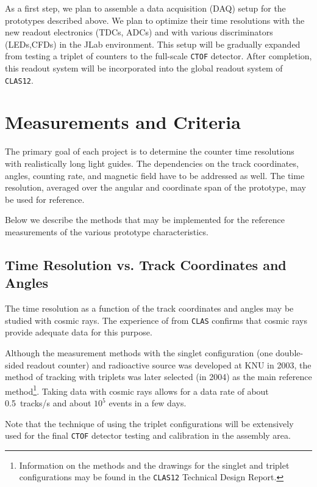 \documentclass[12pt]{article}
\begin{document}
As a first step, we plan to assemble a data acquisition (DAQ) setup for the
prototypes described above.  We plan to optimize their time resolutions with 
the new readout electronics (TDCs, ADCs) and with various discriminators
(LEDs,CFDs) in the JLab environment.  This setup will be gradually expanded
from testing a triplet of counters to the full-scale {\tt CTOF} detector. 
After completion, this readout system will be incorporated into the global 
readout system of {\tt CLAS12}.

\section{Measurements and Criteria}
\label{mescre}

The primary goal of each project is to determine the counter time 
resolutions with realistically long light guides.  The dependencies on the 
track coordinates, angles, counting rate, and magnetic field have to be 
addressed as well.  The time resolution, averaged over the angular and 
coordinate span of the prototype, may be used for reference.

Below we describe the methods that may be implemented for the reference 
measurements of the various prototype characteristics. 

\subsection{Time Resolution vs. Track Coordinates and Angles} 

The time resolution as a function of the track coordinates and angles may 
be studied with cosmic rays.  The experience of from {\tt CLAS} confirms 
that cosmic rays provide adequate data for this purpose. 
 
Although the measurement methods with the singlet configuration (one 
double-sided readout counter) and radioactive source was developed at KNU 
in 2003, the method of tracking with triplets was later selected (in 2004)
as the main reference method\footnote{Information on the methods and the 
drawings for the singlet and triplet configurations may be found in the 
{\tt CLAS12} Technical Design Report.}.  Taking data with cosmic rays allows
for a data rate of about 0.5~tracks/s and about $10^5$ events in a few days.
 
Note that the technique of using the triplet configurations will be 
extensively used for the final {\tt CTOF} detector testing and calibration
in the assembly area.
\end{document}
